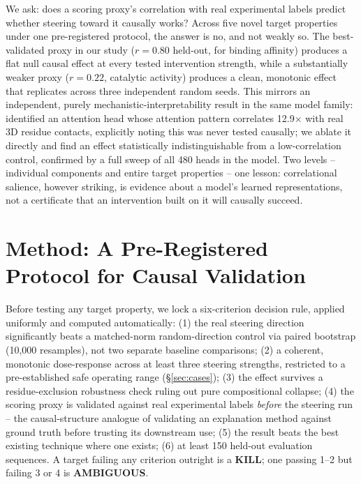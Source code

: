\documentclass{article}
\begin{document}
We ask: does a scoring proxy's correlation with real experimental labels
predict whether steering toward it causally works? Across five novel
target properties under one pre-registered protocol, the answer is no,
and not weakly so. The best-validated proxy in our study ($r=0.80$
held-out, for binding affinity) produces a flat null causal effect at
every tested intervention strength, while a substantially weaker proxy
($r=0.22$, catalytic activity) produces a clean, monotonic effect that
replicates across three independent random seeds. This mirrors an
independent, purely mechanistic-interpretability result in the same
model family: \citet{vig2021bertology} identified an attention head whose
attention pattern correlates 12.9$\times$ with real 3D residue contacts,
explicitly noting this was never tested causally; we ablate it directly
and find an effect statistically indistinguishable from a low-correlation
control, confirmed by a full sweep of all 480 heads in the model. Two
levels -- individual components and entire target properties -- one
lesson: correlational salience, however striking, is evidence about a
model's learned representations, not a certificate that an intervention
built on it will causally succeed.

\section{Method: A Pre-Registered Protocol for Causal Validation}
\label{sec:method}

Before testing any target property, we lock a six-criterion decision
rule, applied uniformly and computed automatically: (1) the real steering
direction significantly beats a matched-norm random-direction control via
paired bootstrap (10{,}000 resamples), not two separate baseline
comparisons; (2) a coherent, monotonic dose-response across at least
three steering strengths, restricted to a pre-established safe operating
range (\S\ref{sec:cases}); (3) the effect survives a residue-exclusion
robustness check ruling out pure compositional collapse; (4) the scoring
proxy is validated against real experimental labels \emph{before} the
steering run -- the causal-structure analogue of validating an
explanation method against ground truth before trusting its downstream
use; (5) the result beats the best existing technique where one exists;
(6) at least 150 held-out evaluation sequences. A target failing any
criterion outright is a \textbf{KILL}; one passing 1--2 but failing 3 or
4 is \textbf{AMBIGUOUS}.
\end{document}
